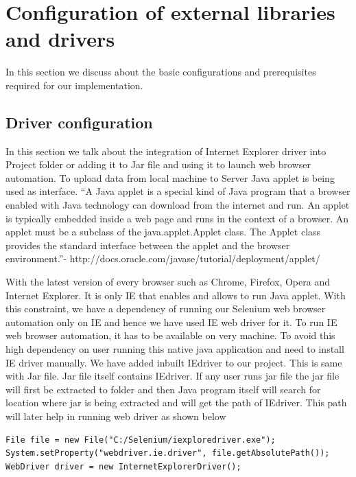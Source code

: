 \documentclass[12pt]{report}
\begin{document}
\section*{Configuration of external libraries and drivers}
In this section we discuss about the basic configurations and prerequisites required for our implementation.
\subsection*{Driver configuration}

In this section we talk about the integration of Internet Explorer driver into Project folder or adding it to Jar file and using it to launch web browser automation. To upload data from local machine to Server Java applet is being used as interface. “A Java applet is a special kind of Java program that a browser enabled with Java technology can download from the internet and run. An applet is typically embedded inside a web page and runs in the context of a browser. An applet must be a subclass of the java.applet.Applet class. The Applet class provides the standard interface between the applet and the browser environment.”- http://docs.oracle.com/javase/tutorial/deployment/applet/

With the latest version of every browser such as Chrome, Firefox, Opera and Internet Explorer. It is only IE that enables and allows to run Java applet. With this constraint, we have a dependency of running our Selenium web browser automation only on IE and hence we have used IE web driver for it. To run IE web browser automation, it has to be available on very machine. To avoid this high dependency on user running this native java application and need to install IE driver manually. We have added inbuilt IEdriver to our project. This is same with Jar file. Jar file itself contains IEdriver. If any user runs jar file the jar file will first be extracted to folder and then Java program itself will search for location where jar is being extracted and will get the path of IEdriver. This path will later help in running web driver as shown below
\begin{verbatim}
File file = new File("C:/Selenium/iexploredriver.exe");
System.setProperty("webdriver.ie.driver", file.getAbsolutePath());
WebDriver driver = new InternetExplorerDriver();
\end{verbatim}
\end{document}
